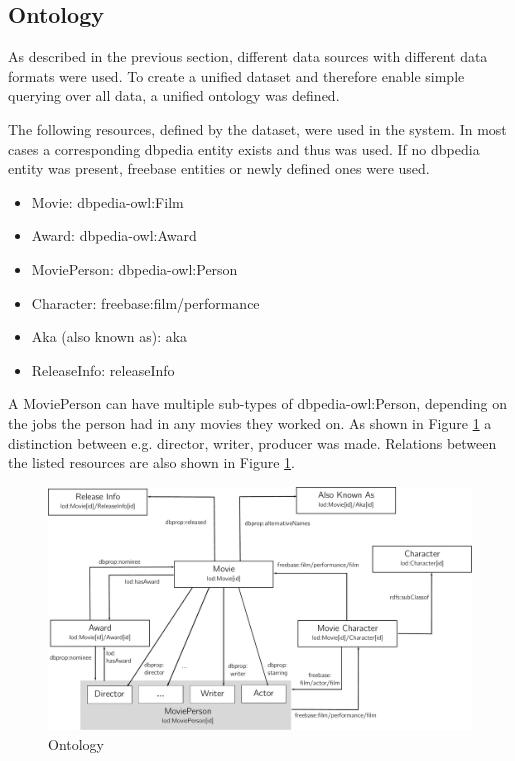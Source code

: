 \subsection{Ontology}
\label{subsec_method_ontology}

As described in the previous section, different data sources with different data formats were used. 
To create a unified dataset and therefore enable simple querying over all data, a unified ontology was defined.


The following resources, defined by the dataset, were used in the system. 
In most cases a corresponding dbpedia entity exists and thus was used.
If no dbpedia entity was present, freebase entities or newly defined ones were used.

\begin{itemize}
\item Movie: dbpedia-owl:Film
\item Award: dbpedia-owl:Award
\item MoviePerson: dbpedia-owl:Person
\item Character: freebase:film/performance
\item Aka (also known as): aka
\item ReleaseInfo: releaseInfo

\end{itemize}

A MoviePerson can have multiple sub-types of dbpedia-owl:Person, depending on the jobs the person had in any movies they worked on. 
As shown in Figure \ref{fig_ontology} a distinction between e.g. director, writer, producer was made.
Relations between the listed resources are also shown in Figure \ref{fig_ontology}.



\begin{figure}[h!]
\includegraphics[width=\textwidth]{images/ontology.pdf}
\caption{Ontology}
\label{fig_ontology}
\end{figure}


